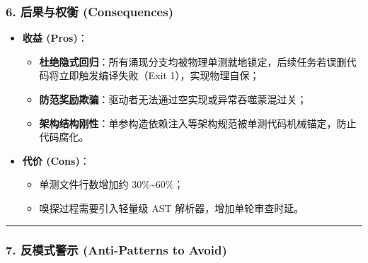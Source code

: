 \documentclass[
]{ctexart}
\providecommand{\tightlist}{%
  \setlength{\itemsep}{0pt}\setlength{\parskip}{0pt}}
\renewcommand{\_}{\discretionary{}{}{\textunderscore}}
\begin{document}
\subsubsection{6. 后果与权衡
(Consequences)}\label{ux540eux679cux4e0eux6743ux8861-consequences-7}

\begin{itemize}
\tightlist
\item
  \textbf{收益 (Pros)}：

  \begin{itemize}
  \tightlist
  \item
    \textbf{杜绝隐式回归}：所有涌现分支均被物理单测就地锁定，后续任务若误删代码将立即触发编译失败（Exit
    1），实现物理自保；
  \item
    \textbf{防范奖励欺骗}：驱动者无法通过空实现或异常吞噬蒙混过关；
  \item
    \textbf{架构结构刚性}：单参构造依赖注入等架构规范被单测代码机械锚定，防止代码腐化。
  \end{itemize}
\item
  \textbf{代价 (Cons)}：

  \begin{itemize}
  \tightlist
  \item
    单测文件行数增加约 30\%\textasciitilde60\%；
  \item
    嗅探过程需要引入轻量级 AST 解析器，增加单轮审查时延。
  \end{itemize}
\end{itemize}

\begin{center}\rule{0.5\linewidth}{0.5pt}\end{center}

\subsubsection{7. 反模式警示 (Anti-Patterns to
Avoid)}\label{ux53cdux6a21ux5f0fux8b66ux793a-anti-patterns-to-avoid-7}
\end{document}
